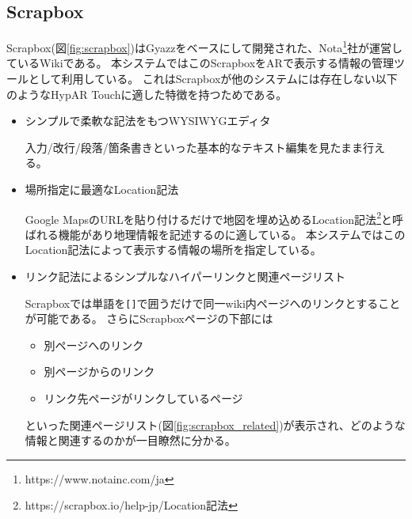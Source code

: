 \subsection{Scrapbox}
Scrapbox(図\ref{fig:scrapbox})はGyazz\cite{Gyazz}をベースにして開発された、Nota\footnote{\textsf{https://www.notainc.com/ja}}社が運営しているWikiである。
本システムではこのScrapboxをARで表示する情報の管理ツールとして利用している。
これはScrapboxが他のシステムには存在しない以下のようなHypAR Touchに適した特徴を持つためである。
\begin{itemize}
  \item シンプルで柔軟な記法をもつWYSIWYGエディタ
  
  入力/改行/段落/箇条書きといった基本的なテキスト編集を見たまま行える。
  
  \item 場所指定に最適なLocation記法
  
  Google MapsのURLを貼り付けるだけで地図を埋め込めるLocation記法\footnote{\textsf{https://scrapbox.io/help-jp/Location記法}}と呼ばれる機能があり地理情報を記述するのに適している。
  本システムではこのLocation記法によって表示する情報の場所を指定している。

  \item リンク記法によるシンプルなハイパーリンクと関連ページリスト
  
  Scrapboxでは単語を\texttt{[]}で囲うだけで同一wiki内ページへのリンクとすることが可能である。
  さらにScrapboxページの下部には
  \begin{itemize}
      \item 別ページへのリンク
      \item 別ページからのリンク
      \item リンク先ページがリンクしているページ
  \end{itemize}
  といった関連ページリスト(図\ref{fig:scrapbox_related})が表示され、どのような情報と関連するのかが一目瞭然に分かる。

\end{itemize}

